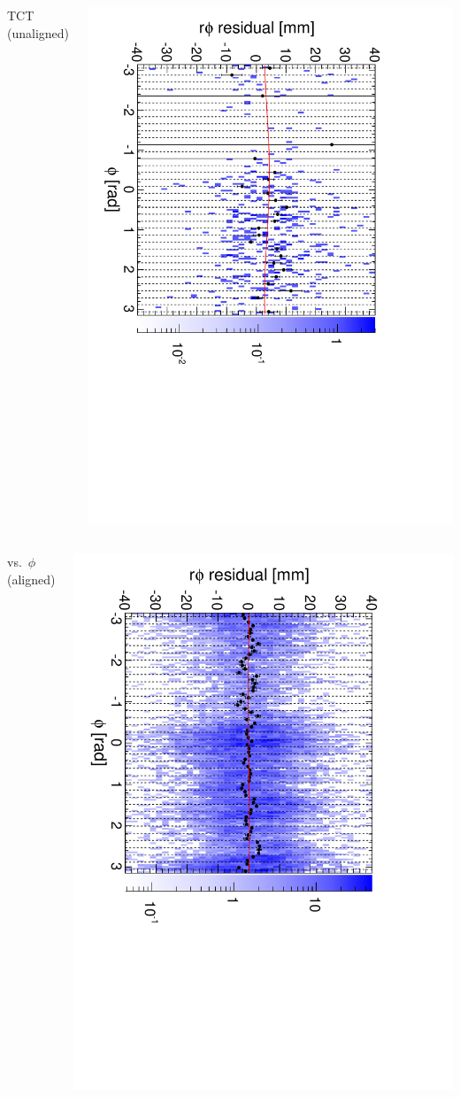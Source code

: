 \documentclass[compress]{beamer}
\begin{document}
\begin{frame}
\begin{columns}
\centering TCT (unaligned)

\includegraphics[height=\linewidth, angle=90]{diskiter01_m2to1outer_TST.pdf}
\end{columns}

\begin{columns}
\centering vs.\ $\phi$ (aligned)

\includegraphics[height=\linewidth, angle=90]{diskiter02_m2to1outer.pdf}


\end{columns}
\end{frame}
\end{document}
